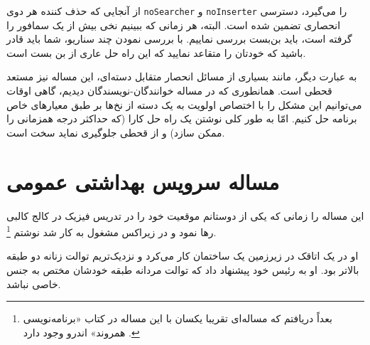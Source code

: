 \documentclass{book}
\begin{document}
    از آنجایی که حذف کننده هر دوی  {\tt noSearcher} و {\tt noInserter} را می‌گیرد، دسترسی انحصاری تضمین شده است. 
    البته، هر زمانی که ببینیم نخی بیش از یک سمافور را گرفته است، باید بن‌بست بررسی نماییم. با بررسی نمودن چند سناریو، 
    شما باید قادر باشید که خودتان را متقاعد نمایید که این راه حل عاری از بن بست است. 

    به عبارت دیگر، مانند بسیاری از مسائل انحصار متقابل دسته‌ای، این مساله نیز مستعد قحطی است. 
    همانطوری که در مساله خوانندگان-نویسندگان دیدیم، گاهی اوقات می‌توانیم این مشکل را با اختصاص اولویت به یک دسته از نخ‌ها 
    بر طبق معیارهای خاص برنامه حل کنیم. 
    امّا به طور کلی نوشتن یک راه حل کارا (که حداکثر درجه همزمانی را ممکن سازد) و از قحطی جلوگیری نماید سخت است. 


\section{مساله سرویس بهداشتی عمومی}

    این مساله را زمانی که یکی از دوستانم موقعیت خود را در تدریس فیزیک در کالج کالبی رها نمود 
    و در زیراکس مشغول به کار شد نوشتم%
    \footnote{بعداً دریافتم که مساله‌ای تقریبا یکسان با این مساله در کتاب «برنامه‌نویسی همروند» اندرو وجود دارد \cite{andrews}.}. 

    او در یک اتاقک در زیرزمین یک ساختمان کار می‌کرد و نزدیک‌تریم توالت زنانه دو طبقه بالاتر بود.
    او به رئیس خود پیشنهاد داد که توالت مردانه طبقه خودشان مختص به جنس خاصی نباشد. 
\end{document}
